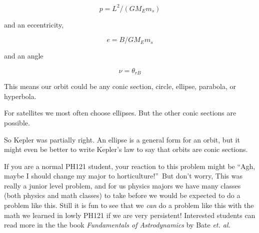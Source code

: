 $$p=L^{2}/\left( GM_{E}m_{s}\right) $$

and an eccentricity, 
 
$$e=B/GM_{E}m_{s}$$

and an angle 

$$\nu =\theta _{rB}$$

This means our orbit could be any conic section, circle, ellipse, parabola, or hyperbola.

For satellites we most often choose ellipses. But the other conic sections are possible.

So Kepler was partially right. An ellipse is a general form for an orbit, but it might even be better to write Kepler's law to say that orbits are conic sections.


If you are a normal PH121 student, your reaction to this problem might be \textquotedblleft Agh, maybe I should change my major to
horticulture!\textquotedblright\ But don't worry, This was really a junior level problem, and for us physics majors we have many classes (both physics and math classes) to take before we would be expected to do a problem like this. Still it is fun to see that we \emph{can} do a problem like this with the math we learned in lowly PH121 if we are very persistent!  Interested students can read more in the the book \textit{Fundamentals of Astrodynamics} by Bate \textit{et. al.} \cite{Bate1971}\cite{ExplainingComputers2021}
	
